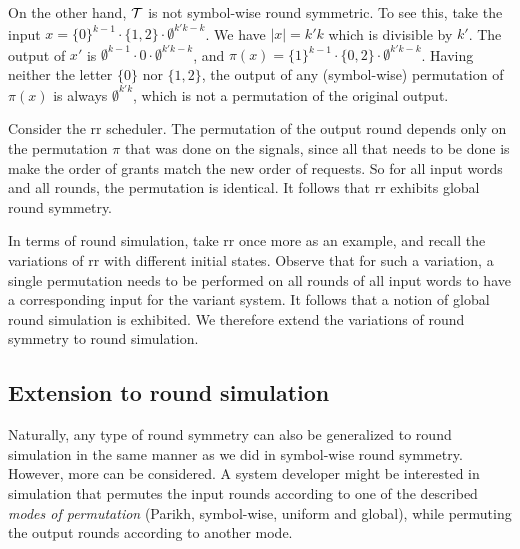 \begin{example}
On the other hand, $\mathcal{T}$ is not symbol-wise round symmetric. To see this, take the input $x=\{0\}^{k-1}\cdot\{1,2\}\cdot\emptyset^{k'k-k}$. We have $|x|=k'k$ which is divisible by $k'$. The output of $x'$ is $\emptyset^{k-1}\cdot0\cdot\emptyset^{k'k-k}$, and $\pi(x)=\{1\}^{k-1}\cdot\{0,2\}\cdot\emptyset^{k'k-k}$. Having neither the letter $\{0\}$ nor $\{1,2\}$, the output of any (symbol-wise) permutation of $\pi(x)$ is always $\emptyset^{k'k}$, which is not a permutation of the original output.

\end{example}

\begin{example}
Consider the \gls{rr} scheduler. The permutation of the output round depends only on the permutation $\pi$ that was done on the signals, since all that needs to be done is make the order of grants match the new order of requests. So for all input words and all rounds, the permutation is identical. It follows that \gls{rr} exhibits global round symmetry.
\end{example}

In terms of round simulation, take \gls{rr} once more as an example, and recall the variations of \gls{rr} with different initial states. Observe that for such a variation, a single permutation needs to be performed on all rounds of all input words to have a corresponding input for the variant system. It follows that a notion of global round simulation is exhibited. We therefore extend the variations of round symmetry to round simulation.

\subsection{Extension to round simulation}

Naturally, any type of round symmetry can also be generalized to round simulation in the same manner as we did in symbol-wise round symmetry. However, more can be considered. A system developer might be interested in simulation that permutes the input rounds according to one of the described \emph{modes of permutation} (Parikh, symbol-wise, uniform and global), while permuting the output rounds according to another mode.

